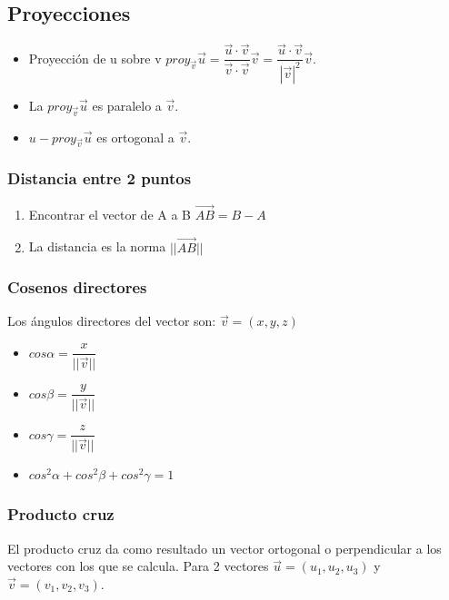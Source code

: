 \subsection{Proyecciones}
\begin{itemize}
	\item Proyección de u sobre v
	$proy_{\overrightarrow{v}}\overrightarrow{u}=\dfrac{\overrightarrow{u}\cdot \overrightarrow{v}}{\overrightarrow{v}\cdot \overrightarrow{v}}\overrightarrow{v}=\dfrac{\overrightarrow{u}\cdot \overrightarrow{v}}{|\overrightarrow{v}|^2}\overrightarrow{v}$.
	\item La $proy_{\overrightarrow{v}}\overrightarrow{u}$ es paralelo a $\overrightarrow{v}$.
	\item $u-proy_{\overrightarrow{v}}\overrightarrow{u}$ es ortogonal a $\overrightarrow{v}$.
\end{itemize}

\subsubsection{Distancia entre 2 puntos}
\begin{enumerate}
	\item Encontrar el vector de A a B $\overrightarrow{AB}=B-A$
	\item La distancia es la norma $||\overrightarrow{AB}||$
\end{enumerate}

\subsubsection{Cosenos directores}
Los ángulos directores del vector son: $\overrightarrow{v}=(x,y,z)$

\begin{itemize}
	\item $cos\alpha=\dfrac{x}{||\overrightarrow{v}||}$
	\item $cos\beta=\dfrac{y}{||\overrightarrow{v}||}$
	\item $cos\gamma=\dfrac{z}{||\overrightarrow{v}||}$
	\item $cos^2\alpha+cos^2\beta+cos^2\gamma=1$
\end{itemize}


\subsubsection{Producto cruz}
El producto cruz da como resultado un vector ortogonal o perpendicular a los vectores con los que se calcula. Para 2 vectores $\overrightarrow{u}=(u_1,u_2,u_3)$ y $\overrightarrow{v}=(v_1,v_2,v_3)$.

